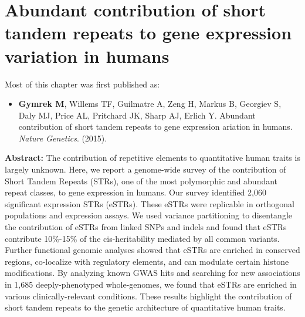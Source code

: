 \chapter{Abundant contribution of short tandem repeats to gene expression variation in humans}

\hzline

Most of this chapter was first published as:

\begin{itemize}
\item[] \textbf{Gymrek M}, Willems TF, Guilmatre A, Zeng H, Markus B, Georgiev S, Daly MJ, Price AL, Pritchard JK, Sharp AJ, Erlich Y. Abundant contribution of short tandem repeats to gene expression ariation in humans. \emph{Nature Genetics}. (2015).
\end{itemize}

\hzline

\textbf{Abstract:} The contribution of repetitive elements to quantitative human traits is largely unknown. Here, we report a genome-wide survey of the contribution of Short Tandem Repeats (STRs), one of the most polymorphic and abundant repeat classes, to gene expression in humans. Our survey identified 2,060 significant expression STRs (eSTRs). These eSTRs were replicable in orthogonal populations and expression assays. We used variance partitioning to disentangle the contribution of eSTRs from linked SNPs and indels and found that eSTRs contribute 10\%-15\% of the cis-heritability mediated by all common variants. Further functional genomic analyses showed that eSTRs are enriched in conserved regions, co-localize with regulatory elements, and can modulate certain histone modifications. By analyzing known GWAS hits and searching for new associations in 1,685 deeply-phenotyped whole-genomes, we found that eSTRs are enriched in various clinically-relevant conditions. These results highlight the contribution of short tandem repeats to the genetic architecture of quantitative human traits.

